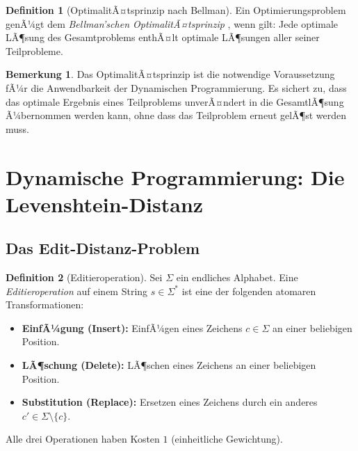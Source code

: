 ﻿\documentclass[a4paper,12pt]{article}
\theoremstyle{definition}
\newtheorem{definition}{Definition}
\newtheorem{bemerkung}{Bemerkung}
\begin{document}
\begin{definition}[OptimalitÃ¤tsprinzip nach Bellman]
    Ein Optimierungsproblem genÃ¼gt dem \emph{Bellman'schen OptimalitÃ¤tsprinzip}
    \cite{bellman1957}, wenn gilt: Jede optimale LÃ¶sung des Gesamtproblems
    enthÃ¤lt optimale LÃ¶sungen aller seiner Teilprobleme.
\end{definition}

\begin{bemerkung}
    Das OptimalitÃ¤tsprinzip ist die notwendige Voraussetzung fÃ¼r die Anwendbarkeit
    der Dynamischen Programmierung. Es sichert zu, dass das optimale Ergebnis eines
    Teilproblems unverÃ¤ndert in die GesamtlÃ¶sung Ã¼bernommen werden kann, ohne dass
    das Teilproblem erneut gelÃ¶st werden muss.
\end{bemerkung}

\section{Dynamische Programmierung: Die Levenshtein-Distanz}

\subsection{Das Edit-Distanz-Problem}

\begin{definition}[Editieroperation]
    Sei $\Sigma$ ein endliches Alphabet. Eine \emph{Editieroperation} auf einem
    String $s \in \Sigma^*$ ist eine der folgenden atomaren Transformationen:
    \begin{itemize}
        \item \textbf{EinfÃ¼gung (Insert):} EinfÃ¼gen eines Zeichens $c \in \Sigma$
              an einer beliebigen Position.
        \item \textbf{LÃ¶schung (Delete):} LÃ¶schen eines Zeichens an einer
              beliebigen Position.
        \item \textbf{Substitution (Replace):} Ersetzen eines Zeichens durch
              ein anderes $c' \in \Sigma \setminus \{c\}$.
    \end{itemize}
    Alle drei Operationen haben Kosten $1$ (einheitliche Gewichtung).
\end{definition}
\end{document}
